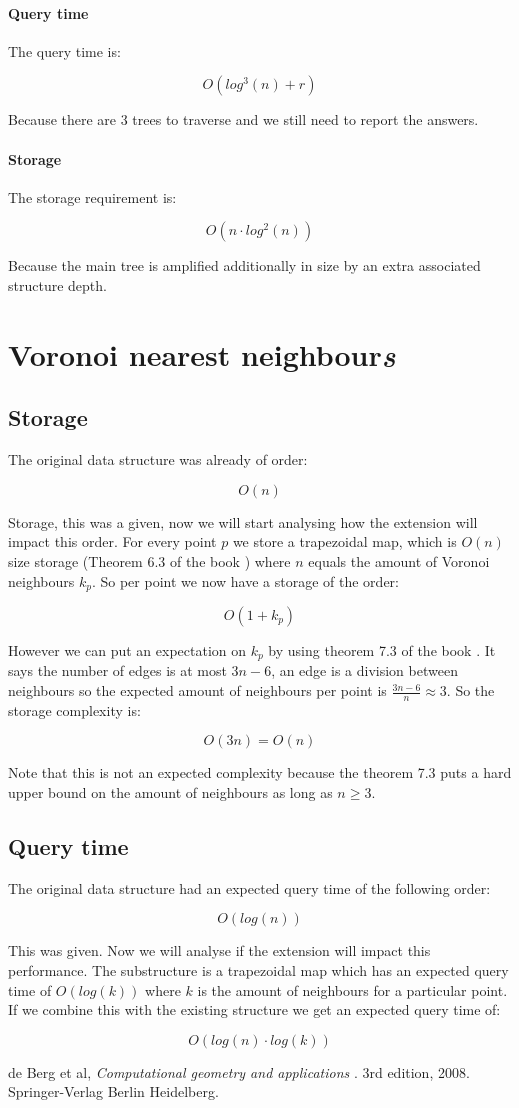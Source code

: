 \documentclass{article}
\begin{document}
\paragraph{Query time}
The query time is:

\[ O(log^3(n)+r) \]

Because there are 3 trees to traverse and we still need to report the answers.
\paragraph{Storage}
The storage requirement is:

\[O(n\cdot log^2(n))\]

Because the main tree is amplified additionally in size by an extra associated
structure depth.
\section{Voronoi nearest neighbour\emph{s}}
\subsection{Storage}
The original data structure was already of order:

\[O(n)\]

Storage, this was a given, now we will start analysing how the extension
will impact this order.
For every point $p$ we store a trapezoidal map, which is $O(n)$ size
storage (Theorem 6.3 of the book \cite{book}) where $n$ equals the amount of
Voronoi neighbours $k_p$. So per point we now have a storage of the order:

\[O(1+k_p)\]

However we can put an expectation on $k_p$ by using theorem 7.3 of the book
\cite{book}. It says the number of edges is at most $3n-6$, an edge is a
division between neighbours so the expected amount of neighbours per point
is $\frac{3n-6}{n} \approx 3$. So the storage complexity is:

\[ O(3n) = O(n) \]

Note that this is not an expected complexity because the theorem 7.3 puts
a hard upper bound on the amount of neighbours as long as $n\geq3$.
\subsection{Query time}
The original data structure had an expected query time of the following order:

\[O(log(n))\]

This was given. Now we will analyse if the extension will impact this
performance. The substructure is a trapezoidal map which has an expected
query time of $O(log(k))$ where $k$ is the amount of neighbours for a
particular point. If we combine this with the existing structure
we get an expected query time of:

\[O(log(n) \cdot log(k)) \]

\begin{thebibliography}{9}
de Berg et al,
\textit{Computational geometry and applications }.
3rd edition, 2008. Springer-Verlag Berlin Heidelberg.
\end{thebibliography}
\end{document}
